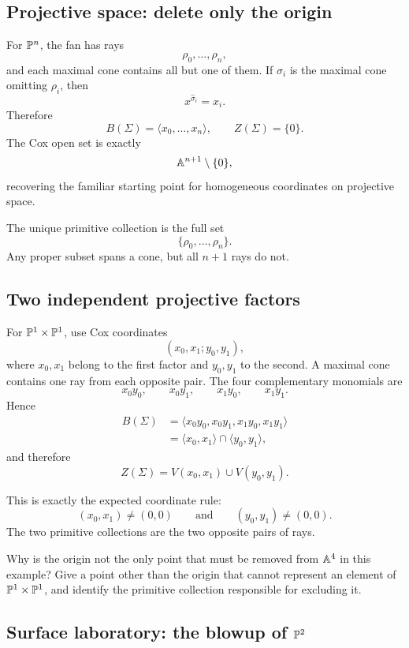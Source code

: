 \subsection{Projective space: delete only the origin}

For \(\mathbb{P}^n\), the fan has rays
\[
\rho_0,\dots,\rho_n,
\]
and each maximal cone contains all but one of them. If \(\sigma_i\)
is the maximal cone omitting \(\rho_i\), then
\[
x^{\widehat\sigma_i}=x_i.
\]
Therefore
\[
B(\Sigma)=\langle x_0,\dots,x_n\rangle,
\qquad
Z(\Sigma)=\{0\}.
\]
The Cox open set is exactly
\[
\mathbb{A}^{n+1}\setminus\{0\},
\]
recovering the familiar starting point for homogeneous coordinates on
projective space.

The unique primitive collection is the full set
\[
\{\rho_0,\dots,\rho_n\}.
\]
Any proper subset spans a cone, but all \(n+1\) rays do not.

\subsection{Two independent projective factors}

For \(\mathbb{P}^1\times\mathbb{P}^1\), use Cox coordinates
\[
(x_0,x_1;y_0,y_1),
\]
where \(x_0,x_1\) belong to the first factor and \(y_0,y_1\) to the
second. A maximal cone contains one ray from each opposite pair. The
four complementary monomials are
\[
x_0y_0,
\qquad
x_0y_1,
\qquad
x_1y_0,
\qquad
x_1y_1.
\]
Hence
\[
\begin{aligned}
B(\Sigma)
&=
\langle x_0y_0,x_0y_1,x_1y_0,x_1y_1\rangle
\\
&=
\langle x_0,x_1\rangle
\cap
\langle y_0,y_1\rangle,
\end{aligned}
\]
and therefore
\[
\boxed{
Z(\Sigma)
=
V(x_0,x_1)
\cup
V(y_0,y_1).
}
\]

This is exactly the expected coordinate rule:
\[
(x_0,x_1)\neq(0,0)
\qquad\text{and}\qquad
(y_0,y_1)\neq(0,0).
\]
The two primitive collections are the two opposite pairs of rays.

\begin{pauseandthink}
Why is the origin not the only point that must be removed from
\(\mathbb{A}^4\) in this example? Give a point other than the origin that
cannot represent an element of \(\mathbb{P}^1\times\mathbb{P}^1\), and identify the
primitive collection responsible for excluding it.
\end{pauseandthink}

\subsection{Surface laboratory: the blowup of \texorpdfstring{\(\mathbb{P}^2\)}{P2}}

